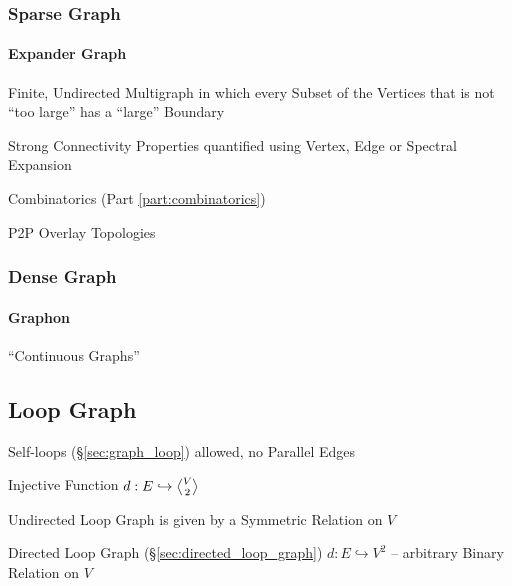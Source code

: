 \subsubsection{Sparse Graph}\label{sec:sparse_graph}

\paragraph{Expander Graph}\label{sec:expander_graph}\hfill


Finite, Undirected Multigraph in which every Subset of the Vertices that is not
``too large'' has a ``large'' Boundary

Strong Connectivity Properties quantified using Vertex, Edge or Spectral
Expansion

Combinatorics (Part \ref{part:combinatorics})

P2P Overlay Topologies



\subsubsection{Dense Graph}\label{sec:dense_graph}

\paragraph{Graphon}\label{sec:graphon}

``Continuous Graphs''



\subsection{Loop Graph}\label{sec:loop_graph}

Self-loops (\S\ref{sec:graph_loop}) allowed, no Parallel Edges

Injective Function $d : E \hookrightarrow \angleover{V}{2}$

Undirected Loop Graph is given by a Symmetric Relation on $V$

Directed Loop Graph (\S\ref{sec:directed_loop_graph}) $d : E
\hookrightarrow V^2$ -- arbitrary Binary Relation on $V$



